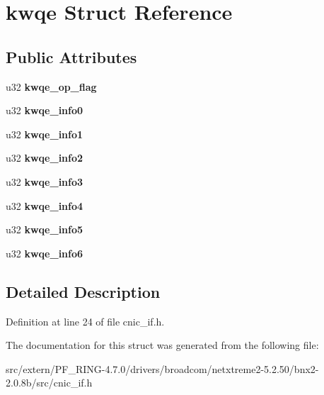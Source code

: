 \hypertarget{structkwqe}{
\section{kwqe Struct Reference}
\label{structkwqe}
}
\subsection*{Public Attributes}
\begin{DoxyCompactItemize}
\item 
\hypertarget{structkwqe_a8b3f1f00c4f79b4e8a9b0a69244e1b44}{
u32 {\bfseries kwqe\_\-op\_\-flag}}
\label{structkwqe_a8b3f1f00c4f79b4e8a9b0a69244e1b44}

\item 
\hypertarget{structkwqe_a2cf7b573caea6fadb7ec0a5818989f7f}{
u32 {\bfseries kwqe\_\-info0}}
\label{structkwqe_a2cf7b573caea6fadb7ec0a5818989f7f}

\item 
\hypertarget{structkwqe_a0698563a4b8937a15a67030707222ef3}{
u32 {\bfseries kwqe\_\-info1}}
\label{structkwqe_a0698563a4b8937a15a67030707222ef3}

\item 
\hypertarget{structkwqe_ae0533037007f29d54f9de277f46d899b}{
u32 {\bfseries kwqe\_\-info2}}
\label{structkwqe_ae0533037007f29d54f9de277f46d899b}

\item 
\hypertarget{structkwqe_a43c4fc508ce9215b401c31a357c905af}{
u32 {\bfseries kwqe\_\-info3}}
\label{structkwqe_a43c4fc508ce9215b401c31a357c905af}

\item 
\hypertarget{structkwqe_a7db62f747b66dcb9391226363989adfd}{
u32 {\bfseries kwqe\_\-info4}}
\label{structkwqe_a7db62f747b66dcb9391226363989adfd}

\item 
\hypertarget{structkwqe_af7e46709141f4f5a40c9bddad942222e}{
u32 {\bfseries kwqe\_\-info5}}
\label{structkwqe_af7e46709141f4f5a40c9bddad942222e}

\item 
\hypertarget{structkwqe_ae602e02e2bbb09cb487fa1563b984793}{
u32 {\bfseries kwqe\_\-info6}}
\label{structkwqe_ae602e02e2bbb09cb487fa1563b984793}

\end{DoxyCompactItemize}


\subsection{Detailed Description}


Definition at line 24 of file cnic\_\-if.h.



The documentation for this struct was generated from the following file:\begin{DoxyCompactItemize}
\item 
src/extern/PF\_\-RING-\/4.7.0/drivers/broadcom/netxtreme2-\/5.2.50/bnx2-\/2.0.8b/src/cnic\_\-if.h\end{DoxyCompactItemize}
